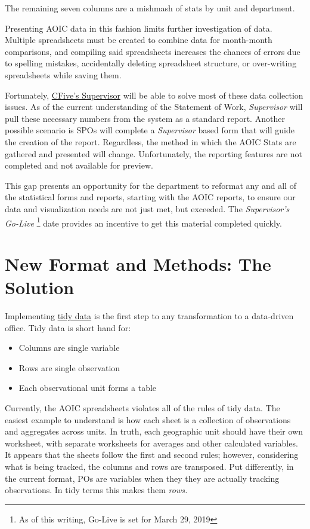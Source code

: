 \documentclass[12pt,]{article}
\providecommand{\tightlist}{%
  \setlength{\itemsep}{0pt}\setlength{\parskip}{0pt}}
\let\rmarkdownfootnote\footnote%
\def\footnote{\protect\rmarkdownfootnote}
\begin{document}
The remaining seven columns are a mishmash of stats by unit and
department.

Presenting AOIC data in this fashion limits further investigation of
data. Multiple spreadsheets must be created to combine data for
month-month comparisons, and compiling said spreadsheets increases the
chances of errors due to spelling mistakes, accidentally deleting
spreadsheet structure, or over-writing spreadsheets while saving them.

Fortunately, \href{https://www.cfive.com/products/supervisor/}{CFive's
Supervisor} will be able to solve most of these data collection issues.
As of the current understanding of the Statement of Work,
\emph{Supervisor} will pull these necessary numbers from the system as a
standard report. Another possible scenario is SPOs will complete a
\emph{Supervisor} based form that will guide the creation of the report.
Regardless, the method in which the AOIC Stats are gathered and
presented will change. Unfortunately, the reporting features are not
completed and not available for preview.

This gap presents an opportunity for the department to reformat any and
all of the statistical forms and reports, starting with the AOIC
reports, to ensure our data and visualization needs are not just met,
but exceeded. The \emph{Supervisor's Go-Live }\footnote{As of this
  writing, Go-Live is set for March 29, 2019} date provides an incentive
to get this material completed quickly.

\hypertarget{new-format-and-methods-the-solution}{%
\section{New Format and Methods: The
Solution}\label{new-format-and-methods-the-solution}}

Implementing \href{http://vita.had.co.nz/papers/tidy-data.html}{tidy
data} is the first step to any transformation to a data-driven office.
Tidy data is short hand for:

\begin{itemize}
\tightlist
\item
  Columns are single variable
\item
  Rows are single observation
\item
  Each observational unit forms a table
\end{itemize}

Currently, the AOIC spreadsheets violates all of the rules of tidy data.
The easiest example to understand is how each sheet is a collection of
observations and aggregates across units. In truth, each geographic unit
should have their own worksheet, with separate worksheets for averages
and other calculated variables. It appears that the sheets follow the
first and second rules; however, considering what is being tracked, the
columns and rows are transposed. Put differently, in the current format,
POs are variables when they they are actually tracking observations. In
tidy terms this makes them \emph{rows.}
\end{document}

